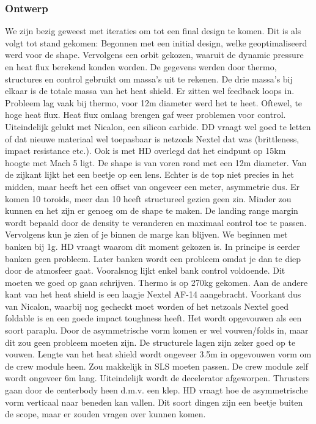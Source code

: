 \subsubsection{Ontwerp}
We zijn bezig geweest met iteraties om tot een final design te komen. Dit is als volgt tot stand gekomen:
\newline\newline
Begonnen met een initial design, welke geoptimaliseerd werd voor de shape. Vervolgens een orbit gekozen, waaruit de dynamic pressure en heat flux berekend konden worden. De gegevens werden door thermo, structures en control gebruikt om massa's uit te rekenen. De drie massa's bij elkaar is de totale massa van het heat shield. Er zitten wel feedback loops in. Probleem lag vaak bij thermo, voor 12m diameter werd het te heet. Oftewel, te hoge heat flux. Heat flux omlaag brengen gaf weer problemen voor control. Uiteindelijk gelukt met Nicalon, een silicon carbide. DD vraagt wel goed te letten of dat nieuwe materiaal wel toepasbaar is netzoals Nextel dat was (brittleness, impact resistance etc.). Ook is met HD overlegd dat het eindpunt op 15km hoogte met Mach 5 ligt.
\newline\newline
De shape is van voren rond met een 12m diameter. Van de zijkant lijkt het een beetje op een lens. Echter is de top niet precies in het midden, maar heeft het een offset van ongeveer een meter, asymmetrie dus. Er komen 10 toroids, meer dan 10 heeft structureel gezien geen zin. Minder zou kunnen en het zijn er genoeg om de shape te maken.
\newline\newline
De landing range margin wordt bepaald door de density te veranderen en maximaal control toe te passen. Vervolgens kun je zien of je binnen de marge kan blijven. We beginnen met banken bij 1g. HD vraagt waarom dit moment gekozen is. In principe is eerder banken geen probleem. Later banken wordt een probleem omdat je dan te diep door de atmosfeer gaat. Vooralsnog lijkt enkel bank control voldoende. Dit moeten we goed op gaan schrijven.
\newline\newline
Thermo is op 270kg gekomen. Aan de andere kant van het heat shield is een laagje Nextel AF-14 aangebracht. Voorkant dus van Nicalon, waarbij nog gecheckt moet worden of het netzoals Nextel goed foldable is en een goede impact toughness heeft. Het wordt opgevouwen als een soort paraplu. Door de asymmetrische vorm komen er wel vouwen/folds in, maar dit zou geen probleem moeten zijn. De structurele lagen zijn zeker goed op te vouwen. Lengte van het heat shield wordt ongeveer 3.5m in opgevouwen vorm om de crew module heen. Zou makkelijk in SLS moeten passen. De crew module zelf wordt ongeveer 6m lang. Uiteindelijk wordt de decelerator afgeworpen. Thrusters gaan door de centerbody heen d.m.v. een klep. HD vraagt hoe de asymmetrische vorm verticaal naar beneden kan vallen. Dit soort dingen zijn een beetje buiten de scope, maar er zouden vragen over kunnen komen. 
